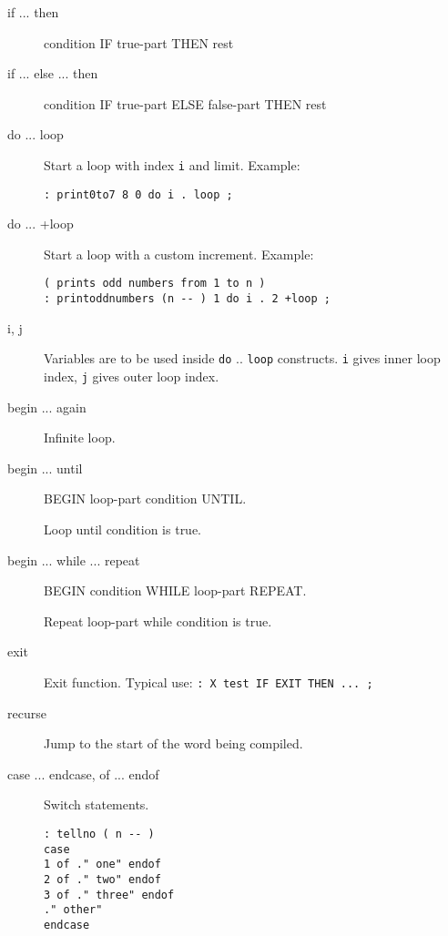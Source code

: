 \begin{description}
\item[if ... then]

condition IF true-part THEN rest

\item[if ... else ... then]

condition IF true-part ELSE false-part THEN rest

\item[do ... loop] Start a loop with index \texttt{i} and limit. Example:

\begin{verbatim}
: print0to7 8 0 do i . loop ;
\end{verbatim}

\item[do ... +loop] Start a loop with a custom increment. Example:

\begin{verbatim}
( prints odd numbers from 1 to n )
: printoddnumbers (n -- ) 1 do i . 2 +loop ;
\end{verbatim}

\item[i, j] Variables are to be used inside \texttt{do} .. \texttt{loop} constructs.
\texttt{i} gives inner loop index, \texttt{j} gives outer loop index.

\item[begin ... again]

Infinite loop.

\item[begin ... until]

BEGIN loop-part condition UNTIL.

Loop until condition is true.

\item[begin ... while ... repeat]

BEGIN condition WHILE loop-part REPEAT.

Repeat loop-part while condition is true.

\item[exit]

Exit function. Typical use: \texttt{: X test IF EXIT THEN ... ;}

\item[recurse] Jump to the start of the word being compiled.

\item[case ... endcase, of ... endof] Switch statements.

\begin{verbatim}
: tellno ( n -- )
case
1 of ." one" endof
2 of ." two" endof
3 of ." three" endof
." other"
endcase
\end{verbatim}

\end{description}

